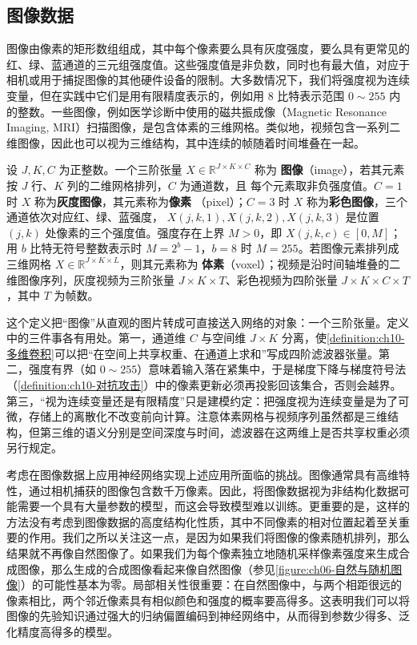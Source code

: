 \documentclass[../../main.tex]{subfiles}
\begin{document}
\subsection{图像数据}\label{subsection:ch10-图像数据}

图像由像素的矩形数组组成，其中每个像素要么具有灰度强度，要么具有更常见的红、绿、蓝通道的三元组强度值。这些强度值是非负数，同时也有最大值，对应于相机或用于捕捉图像的其他硬件设备的限制。大多数情况下，我们将强度视为连续变量，但在实践中它们是用有限精度表示的，例如用 8 比特表示范围 $0\sim 255$ 内的整数。一些图像，例如医学诊断中使用的磁共振成像（Magnetic Resonance Imaging, MRI）扫描图像，是包含体素的三维网格。类似地，视频包含一系列二维图像，因此也可以视为三维结构，其中连续的帧随着时间堆叠在一起。

\begin{definition}[图像数据]\label{definition:ch10-图像数据}
设 $J,K,C$ 为正整数。一个三阶张量 $X\in\mathbb{R}^{J\times K\times C}$ 称为
\textbf{图像}（image），若其元素按 $J$ 行、$K$ 列的二维网格排列，$C$ 为通道数，且
每个元素取非负强度值。$C=1$ 时 $X$ 称为\textbf{灰度图像}，其元素称为\textbf{像素}
（pixel）；$C=3$ 时 $X$ 称为\textbf{彩色图像}，三个通道依次对应红、绿、蓝强度，
$X(j,k,1),X(j,k,2),X(j,k,3)$ 是位置 $(j,k)$ 处像素的三个强度值。强度存在上界
$M>0$，即 $X(j,k,c)\in[0,M]$；用 $b$ 比特无符号整数表示时 $M=2^{b}-1$，$b=8$ 时
$M=255$。若图像元素排列成三维网格 $X\in\mathbb{R}^{J\times K\times L}$，则其元素称为
\textbf{体素}（voxel）；视频是沿时间轴堆叠的二维图像序列，灰度视频为三阶张量
$J\times K\times T$、彩色视频为四阶张量 $J\times K\times C\times T$，其中 $T$ 为帧数。
\end{definition}

\begin{remark}
这个定义把“图像”从直观的图片转成可直接送入网络的对象：一个三阶张量。定义中的三件事各有用处。第一，通道维 $C$ 与空间维 $J\times K$ 分离，使\cref{definition:ch10-多维卷积}可以把“在空间上共享权重、在通道上求和”写成四阶滤波器张量。第二，强度有界（如 $0\sim 255$）意味着输入落在紧集中，于是梯度下降与梯度符号法（\cref{definition:ch10-对抗攻击}）中的像素更新必须再投影回该集合，否则会越界。第三，“视为连续变量还是有限精度”只是建模约定：把强度视为连续变量是为了可微，存储上的离散化不改变前向计算。注意体素网格与视频序列虽然都是三维结构，但第三维的语义分别是空间深度与时间，滤波器在这两维上是否共享权重必须另行规定。
\end{remark}

考虑在图像数据上应用神经网络实现上述应用所面临的挑战。图像通常具有高维特性，通过相机捕获的图像包含数千万像素。因此，将图像数据视为非结构化数据可能需要一个具有大量参数的模型，而这会导致模型难以训练。更重要的是，这样的方法没有考虑到图像数据的高度结构化性质，其中不同像素的相对位置起着至关重要的作用。我们之所以关注这一点，是因为如果我们将图像的像素随机排列，那么结果就不再像自然图像了。如果我们为每个像素独立地随机采样像素强度来生成合成图像，那么生成的合成图像看起来像自然图像（参见\cref{figure:ch06-自然与随机图像}）的可能性基本为零。局部相关性很重要：在自然图像中，与两个相距很远的像素相比，两个邻近像素具有相似颜色和强度的概率要高得多。这表明我们可以将图像的先验知识通过强大的归纳偏置编码到神经网络中，从而得到参数少得多、泛化精度高得多的模型。
\end{document}
